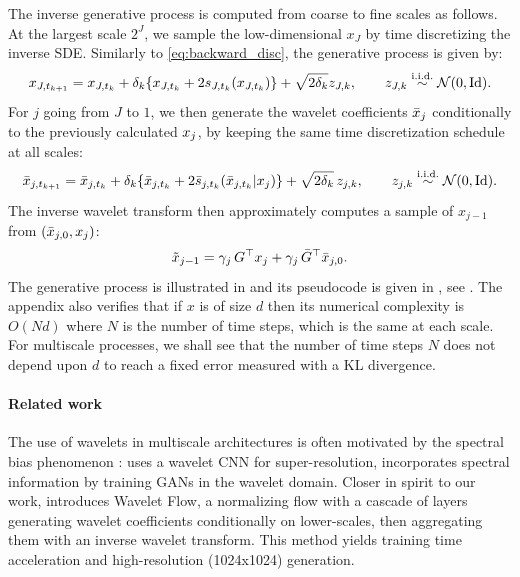 \documentclass{article}
\begin{document}
 
The inverse generative process is computed from coarse to fine scales as follows. 
At the largest scale $2^J$, we sample
the low-dimensional $x_J$ by time discretizing the inverse SDE. Similarly to 
\eqref{eq:backward_disc}, the generative process is given by:
\begin{equation}
  \label{eq:backward_disc2}
  x_{J,t_{k+1}} = x_{J,t_{k}} + \delta_{k} \{ x_{J,t_{k}} + 2  {{s}}_{ J,t_{k}}(x_{J,t_{k}})\} + \sqrt{2 \delta_{k}} z_{J,k} , \qquad z_{J,k}  \overset{\textup{i.i.d.}}{\sim} {\cal N}(0,\operatorname{Id}) . 
\end{equation}
For $j$ going from $J$ to $1$, we then generate the wavelet
coefficients ${\bar x}_j$ conditionally to the previously calculated $x_{j}$, by
keeping the same time discretization schedule at all scales:
  \begin{equation}
  \label{eq:backward_disc2}
  {\bar x}_{j,t_{k+1}} = {\bar x}_{j,t_{k}} + \delta_{k} \{ {\bar x}_{j,t_{k}} + 2  \bar {{s}}_{ j,t_{k}}({\bar x}_{j,t_{k}}|x_{j})\} + \sqrt{2 \delta_{k}}\, z_{j,k} , \qquad z_{j,k}  \overset{\textup{i.i.d.}}{\sim} {\cal N}(0,\operatorname{Id}) . 
\end{equation}
The inverse wavelet transform then approximately computes
a sample of $x_{j-1}$ from $({\bar x}_{j,0}, x_{j})$:
\begin{equation}
  \label{eq:reconstruction}
\tilde{x}_{j-1} = \gamma_j \, G^\top x_{j} + \gamma_j \, {\bar {G}}^\top {\bar x}_{j,0} .
\end{equation}
The generative process is illustrated in  and its pseudocode is given in , see
.  The appendix also verifies that if $x$ is of size $d$ then its numerical complexity is $O(N d)$ where $N$ is the number of time steps, which is the same at each scale. For multiscale processes, we shall see that the number of time steps $N$ does not depend upon $d$ to reach a fixed error measured with a KL divergence.

\paragraph{Related work}
The use of wavelets in multiscale architectures is often motivated by the spectral bias phenomenon \cite{rahaman2019spectral}: \cite{huang2017wavelet} uses a wavelet CNN for super-resolution, \cite{gal2021swagan} incorporates spectral information by training GANs in the wavelet domain. Closer in spirit to our work, \cite{yu2020wavelet} introduces Wavelet Flow, a normalizing flow with a cascade of layers generating wavelet coefficients conditionally on lower-scales, then aggregating them with an inverse wavelet transform. This method yields training time acceleration and high-resolution (1024x1024) generation. 
\end{document}

